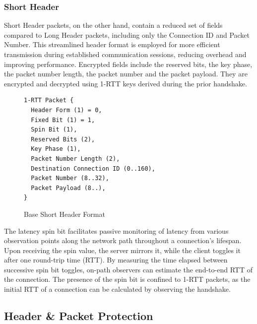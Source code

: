 \subsubsection{Short Header}

Short Header packets, on the other hand, contain a reduced set of fields compared to Long Header packets, including only the Connection ID and Packet Number. This streamlined header format is employed for more efficient transmission during established communication sessions, reducing overhead and improving performance. Encrypted fields include the reserved bits, the key phase, the packet number length, the packet number and the packet payload. They are encrypted and decrypted using 1-RTT keys derived during the prior handshake.

\begin{figure}[htb]
    \centering      
\begin{verbatim}
1-RTT Packet {
  Header Form (1) = 0,
  Fixed Bit (1) = 1,
  Spin Bit (1),
  Reserved Bits (2),
  Key Phase (1),
  Packet Number Length (2),
  Destination Connection ID (0..160),
  Packet Number (8..32),
  Packet Payload (8..),
}
\end{verbatim}
    \caption{Base Short Header Format\cite[98]{rfc9000}}
\end{figure}

The latency spin bit facilitates passive monitoring of latency from various observation points along the network path throughout a connection's lifespan. Upon receiving the spin value, the server mirrors it, while the client toggles it after one round-trip time (RTT). By measuring the time elapsed between successive spin bit toggles, on-path observers can estimate the end-to-end RTT of the connection. The presence of the spin bit is confined to 1-RTT packets, as the initial RTT of a connection can be calculated by observing the handshake.

\subsection{Header \& Packet Protection} \label{packet_protection}

